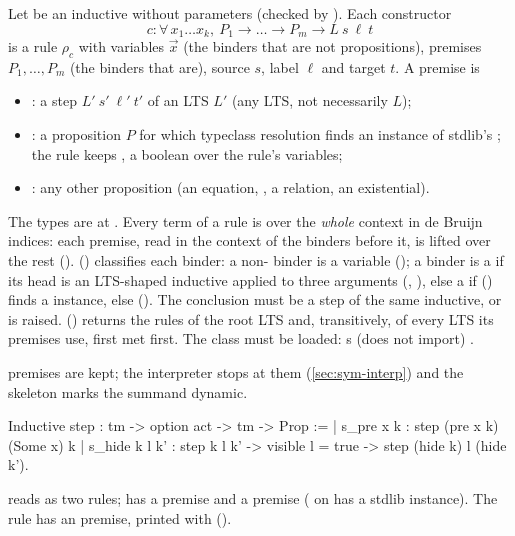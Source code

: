 \begin{definition}[Rule]
Let  be an inductive without
parameters (checked by ). Each constructor
\[
  c : \forall\, x_1\dots x_k,\ P_1 \to \dots \to P_m \to L\ s\ \ell\ t
\]
is a rule $\rho_c$ with variables $\vec x$ (the binders that are not
propositions), premises $P_1,\dots,P_m$ (the binders that are), source
$s$, label $\ell$ and target $t$. A premise is
\begin{itemize}
\item {}: a step $L'\ s'\ \ell'\ t'$ of an LTS $L'$ (any LTS, not
  necessarily $L$);
\item {}: a proposition $P$ for which typeclass resolution finds
  an instance of stdlib's ; the rule keeps
  , a boolean over the rule's variables;
\item {}: any other proposition (an equation, , a
  relation, an existential).
\end{itemize}
\end{definition}

The types are at . Every term of a rule
is over the \emph{whole} context  in de Bruijn indices: each
premise, read in the context of the binders before it, is lifted over the
rest (). 
() classifies each binder: a non-
binder is a variable (); a  binder
is a  if its head is an LTS-shaped inductive applied to three
arguments (, ), else a
 if  () finds a
 instance, else 
(). The conclusion must be a step of the
same inductive, or  is raised. 
() returns the rules of the root LTS
and, transitively, of every LTS its  premises use, first met
first. The  class must be loaded:
 s (does not import)
.

 premises are kept; the interpreter
stops at them (\cref{sec:sym-interp}) and the skeleton marks the summand
dynamic.

\begin{example}
\begin{rocq}
Inductive step : tm -> option act -> tm -> Prop :=
| s_pre x k : step (pre x k) (Some x) k
| s_hide k l k' : step k l k' -> visible l = true -> step (hide k) l (hide k').
\end{rocq}
reads as two rules;  has a  premise and a
 premise (\code{=} on  has a stdlib instance). The
rule  has an
 premise, printed with \code{[Opaque]}
().
\end{example}

